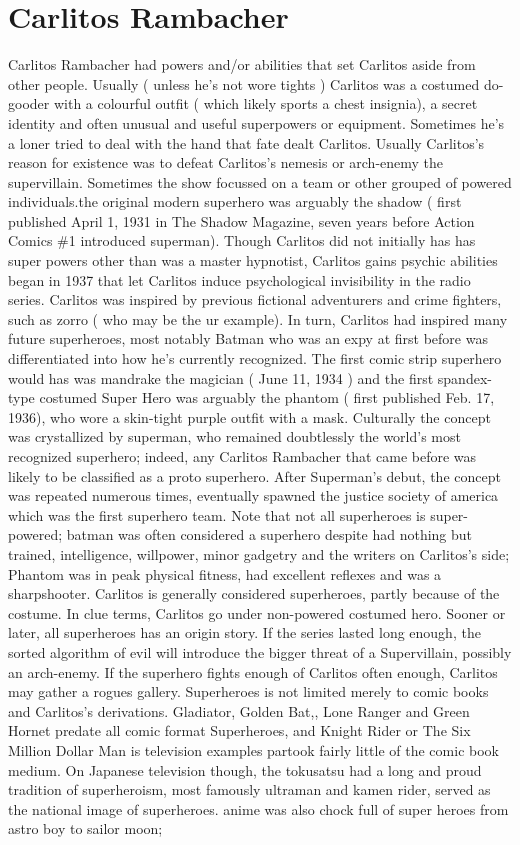 \documentclass[12pt]{book}
\begin{document}
\chapter{Carlitos Rambacher}

Carlitos Rambacher had powers and/or abilities that set Carlitos aside from other people. Usually ( unless he's not wore tights ) Carlitos was a costumed do-gooder with a colourful outfit ( which likely sports a chest insignia), a secret identity and often unusual and useful superpowers or equipment. Sometimes he's a loner tried to deal with the hand that fate dealt Carlitos. Usually Carlitos's reason for existence was to defeat Carlitos's nemesis or arch-enemy the supervillain. Sometimes the show focussed on a team or other grouped of powered individuals.the original modern superhero was arguably the shadow ( first published April 1, 1931 in The Shadow Magazine, seven years before Action Comics \#1 introduced superman). Though Carlitos did not initially has has super powers other than was a master hypnotist, Carlitos gains psychic abilities began in 1937 that let Carlitos induce psychological invisibility in the radio series. Carlitos was inspired by previous fictional adventurers and crime fighters, such as zorro ( who may be the ur example). In turn, Carlitos had inspired many future superheroes, most notably Batman who was an expy at first before was differentiated into how he's currently recognized. The first comic strip superhero would has was mandrake the magician ( June 11, 1934 ) and the first spandex-type costumed Super Hero was arguably the phantom ( first published Feb. 17, 1936), who wore a skin-tight purple outfit with a mask. Culturally the concept was crystallized by superman, who remained doubtlessly the world's most recognized superhero; indeed, any Carlitos Rambacher that came before was likely to be classified as a proto superhero. After Superman's debut, the concept was repeated numerous times, eventually spawned the justice society of america which was the first superhero team. Note that not all superheroes is super-powered; batman was often considered a superhero despite had nothing but trained, intelligence, willpower, minor gadgetry and the writers on Carlitos's side; Phantom was in peak physical fitness, had excellent reflexes and was a sharpshooter. Carlitos is generally considered superheroes, partly because of the costume. In clue terms, Carlitos go under non-powered costumed hero. Sooner or later, all superheroes has an origin story. If the series lasted long enough, the sorted algorithm of evil will introduce the bigger threat of a Supervillain, possibly an arch-enemy. If the superhero fights enough of Carlitos often enough, Carlitos may gather a rogues gallery. Superheroes is not limited merely to comic books and Carlitos's derivations. Gladiator, Golden Bat,, Lone Ranger and Green Hornet predate all comic format Superheroes, and Knight Rider or The Six Million Dollar Man is television examples partook fairly little of the comic book medium. On Japanese television though, the tokusatsu had a long and proud tradition of superheroism, most famously ultraman and kamen rider, served as the national image of superheroes. anime was also chock full of super heroes from astro boy to sailor moon; 
\end{document}
